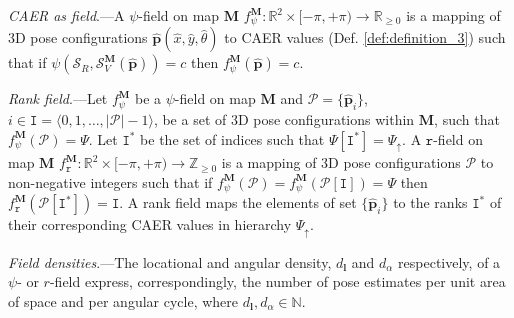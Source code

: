 \begin{definition}
  \label{def:definition_4} \textit{CAER as field}.---A $\psi$-field on map
  $\bm{M}$
  $f_{\psi}^{\bm{M}} : \mathbb{R}^2 \times [-\pi, +\pi) \rightarrow \mathbb{R}_{\geq 0}$
  is a mapping of 3D pose configurations
  $\hat{\bm{p}}(\hat{x},\hat{y},\hat{\theta})$ to CAER values (Def.
  \ref{def:definition_3}) such that if
  $\psi(\mathcal{S}_R,\mathcal{S}_V^{\bm{M}}(\hat{\bm{p}})) = c$ then
  $f_{\psi}^{\bm{M}}(\hat{\bm{p}}) = c$.
\end{definition}

\begin{definition}
  \label{def:definition_5} \textit{Rank field}.---Let $f_{\psi}^{\bm{M}}$ be
  a $\psi$-field on map $\bm{M}$ and $\mathcal{P} = \{\hat{\bm{p}}_i\}$,
  $i \in \texttt{I} = \langle 0,1,\dots,|\mathcal{P}|-1 \rangle$, be a set of 3D pose
  configurations within $\bm{M}$, such that
  $f_{\psi}^{\bm{M}}(\mathcal{P}) = \Psi$. Let $\texttt{I}^{\ast}$
  be the set of indices such that $\Psi[\texttt{I}^{\ast}] = \Psi_\uparrow$.
  A $\texttt{r}$-field on map $\bm{M}$
  $f_{\texttt{r}}^{\bm{M}} : \mathbb{R}^2 \times [-\pi, +\pi) \rightarrow \mathbb{Z}_{\geq 0}$
  is a mapping of 3D pose configurations $\mathcal{P}$ to non-negative integers
  such that if $f_{\psi}^{\bm{M}}(\mathcal{P}) = f_{\psi}^{\bm{M}}(\mathcal{P}[\texttt{I}]) = \Psi$ then
  $f_{\texttt{r}}^{\bm{M}}(\mathcal{P}[\texttt{I}^\ast]) = \texttt{I}$.
  A rank field maps the elements of
  set $\{\hat{\bm{p}}_i\}$
  to the ranks $\texttt{I}^\ast$ of their corresponding CAER values in
  hierarchy $\Psi_\uparrow$.
\end{definition}

\begin{definition}
  \label{def:definition_6} \textit{Field densities}.---The locational and
  angular density, $d_{\bm{l}}$ and $d_{\alpha}$ respectively, of a
  $\psi$- or $r$-field express, correspondingly, the number of pose estimates
  per unit area of space and per angular cycle, where
  $d_{\bm{l}}, d_{\alpha} \in \mathbb{N}$.
\end{definition}

